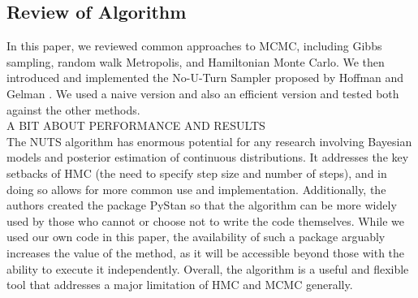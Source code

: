 \documentclass[12pt]{article}
\begin{document}
\subsection{Review of Algorithm}
In this paper, we reviewed common approaches to MCMC, including Gibbs sampling, random walk Metropolis, and Hamiltonian Monte Carlo. We then introduced and implemented the No-U-Turn Sampler proposed by Hoffman and Gelman \citeyear{homan2014no}. We used a naive version and also an efficient version and tested both against the other methods. \\
A BIT ABOUT PERFORMANCE AND RESULTS\\
The NUTS algorithm has enormous potential for any research involving Bayesian models and posterior estimation of continuous distributions. It addresses the key setbacks of HMC (the need to specify step size and number of steps), and in doing so allows for more common use and implementation. Additionally, the authors created the package PyStan so that the algorithm can be more widely used by those who cannot or choose not to write the code themselves. While we used our own code in this paper, the availability of such a package arguably increases the value of the method, as it will be accessible beyond those with the ability to execute it independently. Overall, the algorithm is a useful and flexible tool that addresses a major limitation of HMC and MCMC generally.

\newpage

\end{document}
